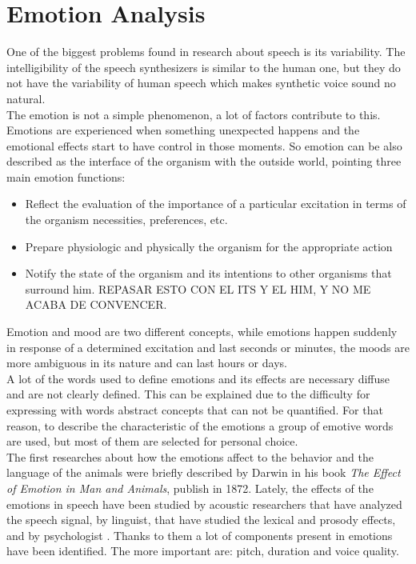 \section{Emotion Analysis}\label{emotana}
One of the biggest problems found in research about speech is its variability. The intelligibility of the speech synthesizers is similar to the human one, but they do not have the variability of human speech which makes synthetic voice sound no natural.\\
The emotion is not a simple phenomenon, a lot of factors contribute to this.\\
Emotions are experienced when something unexpected happens and the emotional effects start to have control in those moments. So emotion can be also described as the interface of the organism with the outside world, pointing three main emotion functions:
\begin{itemize}
 \item Reflect the evaluation of the importance of a particular excitation in terms of the organism necessities, preferences, etc.
 \item Prepare physiologic and physically the organism for the appropriate action
 \item Notify the state of the organism and its intentions to other organisms that surround him. REPASAR ESTO CON EL ITS Y EL HIM, Y NO ME ACABA DE CONVENCER.
\end{itemize}
Emotion and mood are two different concepts, while emotions happen suddenly in response of a determined excitation and last seconds or minutes, the moods are more ambiguous in its nature and can last hours or days.\\
A lot of the words used to define emotions and its effects are necessary diffuse and are not clearly defined. This can be explained due to the difficulty for expressing with words abstract concepts that can not be quantified. For that reason, to describe the characteristic  of the emotions a group of emotive words are used, but most of them are selected for personal choice.\\
The first researches about how the emotions affect to the behavior and the language of the animals were briefly described by Darwin in his book \textit{The Effect of Emotion in Man and Animals}, publish in 1872. Lately, the effects of the emotions in speech have been studied by acoustic researchers that have analyzed the speech signal, by linguist, that have studied the lexical and prosody effects, and by psychologist . Thanks to them a lot of components present in emotions have been identified. The more important are: pitch, duration and voice quality.\\
